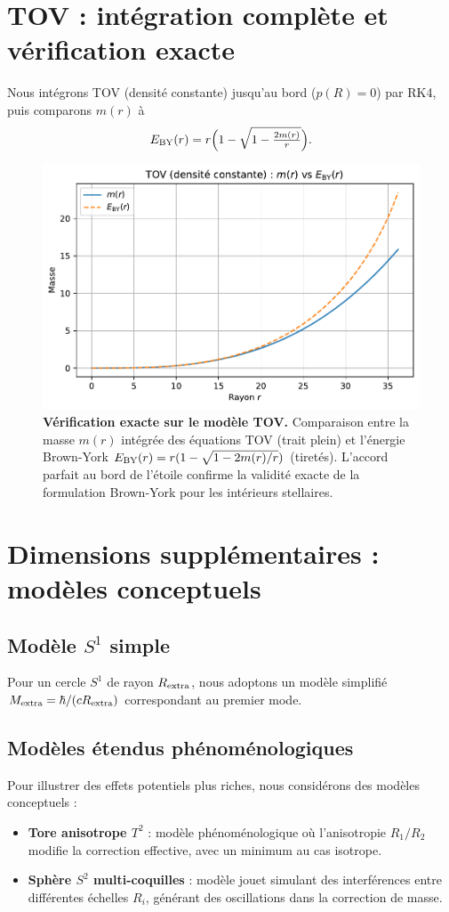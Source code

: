 \documentclass[11pt]{article}
\begin{document}
\section{TOV : int\'egration compl\`ete et v\'erification exacte}
Nous int\'egrons TOV (densit\'e constante) jusqu'au bord (\(p(R)=0\)) par RK4, puis comparons $m(r)$ \`a 
\begin{equation}
E_{\rm BY}(r)=r\Big(1-\sqrt{1-\tfrac{2m(r)}{r}}\Big).
\end{equation}
\begin{figure}[!htb]
\centering
\includegraphics[width=.75\linewidth]{fig_tov_full.pdf}
\caption{\textbf{Vérification exacte sur le modèle TOV.} Comparaison entre la masse $m(r)$ intégrée des équations TOV (trait plein) et l'énergie Brown-York $E_{\rm BY}(r) = r(1-\sqrt{1-2m(r)/r})$ (tiretés). L'accord parfait au bord de l'étoile confirme la validité exacte de la formulation Brown-York pour les intérieurs stellaires.}
\end{figure}
\clearpage

\section{Dimensions suppl\'ementaires : mod\`eles conceptuels}
\subsection{Mod\`ele $S^1$ simple}
Pour un cercle $S^1$ de rayon $R_{\rm extra}$, nous adoptons un mod\`ele simplifi\'e $M_{\rm extra}=\hbar/(c R_{\rm extra})$ correspondant au premier mode.

\subsection{Mod\`eles \'etendus ph\'enom\'enologiques}
Pour illustrer des effets potentiels plus riches, nous consid\'erons des mod\`eles conceptuels : 
\begin{itemize}
\item \textbf{Tore anisotrope $T^2$} : mod\`ele ph\'enom\'enologique o\`u l'anisotropie $R_1/R_2$ modifie la correction effective, avec un minimum au cas isotrope.
\item \textbf{Sph\`ere $S^2$ multi-coquilles} : mod\`ele jouet simulant des interf\'erences entre diff\'erentes \'echelles $R_i$, g\'en\'erant des oscillations dans la correction de masse.
\end{itemize}
\end{document}
